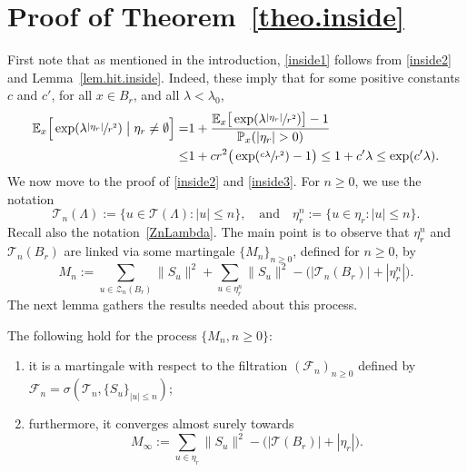 \section{Proof of Theorem~\ref{theo.inside}}\label{sec-inside}
First note that as mentioned in the introduction,
\eqref{inside1} follows from \eqref{inside2} and Lemma~\ref{lem.hit.inside}.
Indeed, these imply that for some positive constants $c$ and $c'$,
for all $x\in B_r$, and all $\lambda<\lambda_0$,
\begin{equation*}
\begin{split}
\mathbb E_x\Big[\exp(\lambda \sfrac{|\eta_r|}{r^2})
\bigm| \eta_r\neq \emptyset\Big]
=& 1+\frac{\mathbb E_x\big[\exp(\lambda \sfrac{|\eta_r|}{r^2})\big]
-1}{\mathbb P_x(|\eta_r|>0)} \\
\le& 1+ cr^2 \big(\exp(\sfrac{c\lambda}{r^2}) - 1\big) \le
1+c'\lambda \le \exp(c'\lambda).
\end{split}
\end{equation*}
We now move to the proof of \eqref{inside2} and \eqref{inside3}.
For $n\ge 0$, we use the notation
\[
\mathcal T_n(\Lambda):=
\{u\in \mathcal T(\Lambda): |u|\le n\}, \quad\text{and}\quad
\eta^n_r:=\{u\in \eta_r: |u|\le n\}.
\]
Recall also the notation~\eqref{ZnLambda}.
The main point is to observe that $\eta^n_r$ and $\mathcal T_n(B_r)$
are linked via some martingale $\{M_n\}_{n\ge 0}$, defined for $n\ge 0$, by
\begin{equation*}%
M_n:= \sum_{u\in \mathcal Z_n(B_r)}
\|S_u\|^2 + \sum_{u\in \eta^n_r} \|S_u\|^2-
\big(|\mathcal T_n(B_r)|+|\eta^n_r|\big).
\end{equation*}
The next lemma gathers the results needed about this process.
\begin{lemma}\label{lem.M}
The following hold for the process $\{M_n, n\ge 0\}$:
\begin{enumerate}
\item it is a martingale with respect to the
filtration $(\mathcal F_n)_{n\ge 0}$ defined by
$\mathcal F_n \!=\! \sigma(\mathbf{\mathcal T}_n, \{S_u\}_{|u|\le n})$;
\item furthermore, it converges almost surely towards
\[
M_\infty := \sum_{u\in \eta_r} \|S_u\|^2-
\big(|\mathbf{\mathcal T}(B_r)|+
|\eta_r|\big).
\]
\end{enumerate}
\end{lemma}
